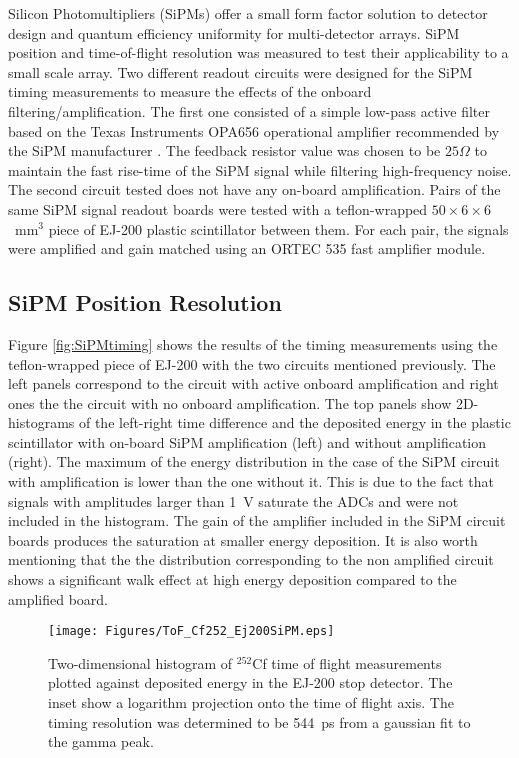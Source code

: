 Silicon Photomultipliers (SiPMs) offer a small form factor solution to detector design and quantum efficiency uniformity for multi-detector arrays. SiPM position and time-of-flight resolution was measured to test their applicability to a small scale array. Two different readout circuits were designed for the SiPM timing measurements to measure the effects of the onboard filtering/amplification. The first one consisted of a simple low-pass active filter based on the Texas Instruments\textsuperscript{\textregistered} OPA656 operational amplifier recommended by the SiPM manufacturer \cite{JseriesUM}. The feedback resistor value was chosen to be $25\Omega$ to maintain the fast rise-time of the SiPM signal while filtering high-frequency noise. The second circuit tested does not have any on-board amplification. Pairs of the same SiPM signal readout boards were tested with a teflon-wrapped $50\times6\times6$~mm$^3$ piece of EJ-200 plastic scintillator between them. For each pair, the signals were amplified and gain matched using an ORTEC\textsuperscript{\textregistered} 535 fast amplifier module.

\subsection{SiPM Position Resolution}
Figure \ref{fig:SiPMtiming} shows the results of the timing measurements using the teflon-wrapped piece of EJ-200 with the two circuits mentioned previously. The left panels correspond to the circuit with active onboard amplification and right ones the the circuit with no onboard amplification. The top panels show 2D-histograms of the left-right time difference and the deposited energy in the plastic scintillator with on-board SiPM amplification (left) and without amplification (right). The maximum of the energy distribution in the case of the SiPM circuit with amplification is lower than the one without it. This is due to the fact that signals with amplitudes larger than 1~V saturate the ADCs and were not included in the histogram. The gain of the amplifier included in the SiPM circuit boards produces the saturation at smaller energy deposition. It is also worth mentioning that the the distribution corresponding to the non amplified circuit shows a significant walk effect at high energy deposition compared to the amplified board.
\begin{figure}[t]
  \texttt{[image: Figures/ToF\_Cf252\_Ej200SiPM.eps]}
  \caption{Two-dimensional histogram of $^{252}$Cf time of flight measurements plotted against deposited energy in the EJ-200 stop detector. The inset show a logarithm projection onto the time of flight axis. The timing resolution was determined to be 544~ps from a gaussian fit to the gamma peak.}
  \label{fig:ToF_SiPM}
\end{figure}

